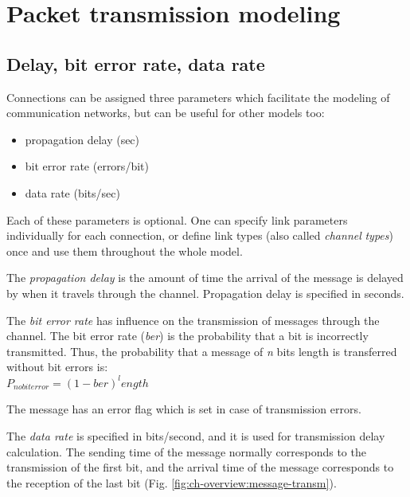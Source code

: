 \section{Packet transmission modeling}
\label{ch:simple-modules:packet-transmission}

\subsection{Delay, bit error rate, data rate}

Connections can be assigned three parameters which facilitate
the modeling of communication networks, but can be useful for
other models too:
\begin{itemize}
  \item{propagation delay (sec)}
  \item{bit error rate (errors/bit)}
  \item{data rate (bits/sec)}
\end{itemize}


Each of these parameters is optional. One can specify link parameters
individually for each connection, or define link types (also
called \textit{channel} \textit{types}) once and use them throughout the
whole model.

The \textit{propagation delay} is the amount of time the arrival of
the message is delayed by when it travels through the channel.
Propagation delay is specified in seconds.

The \textit{bit error rate} has influence on the transmission of messages
through the channel. The bit error rate (\textit{ber}) is the probability that
a bit is incorrectly transmitted. Thus, the probability that
a message of \textit{n} bits length is transferred without bit errors is:\\

$P_{no bit error} = (1 - ber)^length$

The message has an error flag which is set in case of transmission
errors.

The \textit{data rate} is specified in bits/second, and it is used
for transmission delay calculation. The sending time of the message
normally corresponds to the transmission of the first bit, and
the arrival time of the message corresponds to the reception
of the last bit (Fig. \ref{fig:ch-overview:message-transm}).

